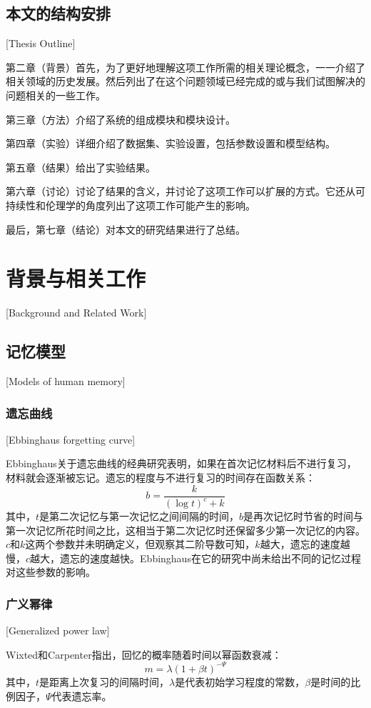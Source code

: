 \section{本文的结构安排}[Thesis Outline]

第二章（背景）首先，为了更好地理解这项工作所需的相关理论概念，一一介绍了相关领域的历史发展。然后列出了在这个问题领域已经完成的或与我们试图解决的问题相关的一些工作。

第三章（方法）介绍了系统的组成模块和模块设计。

第四章（实验）详细介绍了数据集、实验设置，包括参数设置和模型结构。

第五章（结果）给出了实验结果。

第六章（讨论）讨论了结果的含义，并讨论了这项工作可以扩展的方式。它还从可持续性和伦理学的角度列出了这项工作可能产生的影响。

最后，第七章（结论）对本文的研究结果进行了总结。

\chapter{背景与相关工作}[Background and Related Work]

\section{记忆模型}[Models of human memory]

\subsection{遗忘曲线}[Ebbinghaus forgetting curve]

Ebbinghaus关于遗忘曲线的经典研究表明，如果在首次记忆材料后不进行复习，材料就会逐渐被忘记。遗忘的程度与不进行复习的时间存在函数关系：
\begin{equation}
b = \frac{k}{(\log t)^c + k}
\end{equation}
其中，$t$是第二次记忆与第一次记忆之间间隔的时间，$b$是再次记忆时节省的时间与第一次记忆所花时间之比，这相当于第二次记忆时还保留多少第一次记忆的内容。$c$和$k$这两个参数并未明确定义，但观察其二阶导数可知，$k$越大，遗忘的速度越慢，$c$越大，遗忘的速度越快。Ebbinghaus在它的研究中尚未给出不同的记忆过程对这些参数的影响。

\subsection{广义幂律}[Generalized power law]

Wixted和Carpenter\cite{wixtedWickelgrenPowerLaw2007}指出，回忆的概率随着时间以幂函数衰减：
\begin{equation}
m=\lambda(1+\beta t)^{-\Psi}
\end{equation}
其中，$t$是距离上次复习的间隔时间，$\lambda$是代表初始学习程度的常数，$\beta$是时间的比例因子，$\Psi$代表遗忘率。

